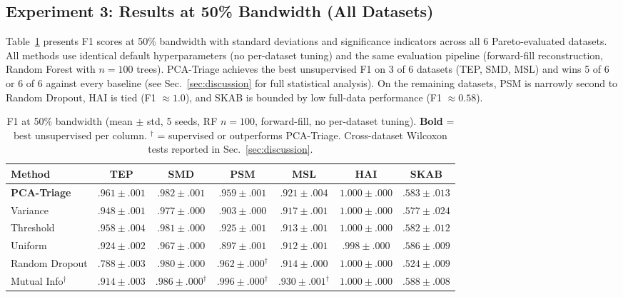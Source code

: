 \documentclass[journal]{IEEEtran}
\begin{document}
\subsection{Experiment 3: Results at 50\% Bandwidth (All Datasets)}

Table~\ref{tab:results50} presents F1 scores at 50\% bandwidth with standard deviations and significance indicators across all 6 Pareto-evaluated datasets. All methods use identical default hyperparameters (no per-dataset tuning) and the same evaluation pipeline (forward-fill reconstruction, Random Forest with $n{=}100$ trees). PCA-Triage achieves the best unsupervised F1 on 3 of 6 datasets (TEP, SMD, MSL) and wins 5 of 6 or 6 of 6 against every baseline (see Sec.~\ref{sec:discussion} for full statistical analysis). On the remaining datasets, PSM is narrowly second to Random Dropout, HAI is tied (F1 $\approx 1.0$), and SKAB is bounded by low full-data performance (F1 $\approx 0.58$).

\begin{table}[t]
\centering
\caption{F1 at 50\% bandwidth (mean $\pm$ std, 5 seeds, RF $n{=}100$, forward-fill, no per-dataset tuning). \textbf{Bold} = best unsupervised per column. $^\dagger$ = supervised or outperforms PCA-Triage. Cross-dataset Wilcoxon tests reported in Sec.~\ref{sec:discussion}.}
\begin{tabular}{@{}lcccccc@{}}
\toprule
\textbf{Method} & \textbf{TEP} & \textbf{SMD} & \textbf{PSM} & \textbf{MSL} & \textbf{HAI} & \textbf{SKAB} \\
\midrule
\textbf{PCA-Triage} & $\mathbf{.961 \pm .001}$ & $\mathbf{.982 \pm .001}$ & $.959 \pm .001$ & $\mathbf{.921 \pm .004}$ & $1.000 \pm .000$ & $.583 \pm .013$ \\
Variance & $.948 \pm .001$ & $.977 \pm .000$ & $.903 \pm .000$ & $.917 \pm .001$ & $\mathbf{1.000 \pm .000}$ & $.577 \pm .024$ \\
Threshold & $.958 \pm .004$ & $.981 \pm .000$ & $.925 \pm .001$ & $.913 \pm .001$ & $1.000 \pm .000$ & $.582 \pm .012$ \\
Uniform & $.924 \pm .002$ & $.967 \pm .000$ & $.897 \pm .001$ & $.912 \pm .001$ & $.998 \pm .000$ & $\mathbf{.586 \pm .009}$ \\
Random Dropout & $.788 \pm .003$ & $.980 \pm .000$ & $\mathbf{.962 \pm .000}^\dagger$ & $.914 \pm .000$ & $1.000 \pm .000$ & $.524 \pm .009$ \\
Mutual Info$^\dagger$ & $.914 \pm .003$ & $.986 \pm .000^\dagger$ & $.996 \pm .000^\dagger$ & $.930 \pm .001^\dagger$ & $1.000 \pm .000$ & $.588 \pm .008$ \\
\bottomrule
\end{tabular}
\label{tab:results50}
\end{table}
\end{document}
